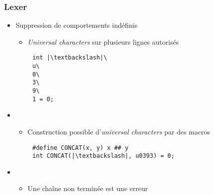 \documentclass[C++.tex]{subfiles}
\begin{document}
\begin{frame}[fragile]
	\frametitle{Lexer}

	\begin{itemize}
		\item Suppression de comportements indéfinis
		\begin{itemize}
			\item \textit{Universal characters} sur plusieurs lignes autorisés
		\end{itemize}
	\end{itemize}

	\begin{verbatim}
		int |\textbackslash|\
		u\
		0\
		3\
		9\
		1 = 0;
	\end{verbatim}

	\begin{itemize}
		\item [] \begin{itemize}
			\item Construction possible d'\textit{universal characters} par des macros
		\end{itemize}
	\end{itemize}

	\begin{verbatim}
		#define CONCAT(x, y) x ## y
		int CONCAT(|\textbackslash|, u0393) = 0;
	\end{verbatim}

	\begin{itemize}
		\item [] \begin{itemize}
			\item Une chaîne non terminée est une erreur
		\end{itemize}
	\end{itemize}

\end{frame}
\end{document}

